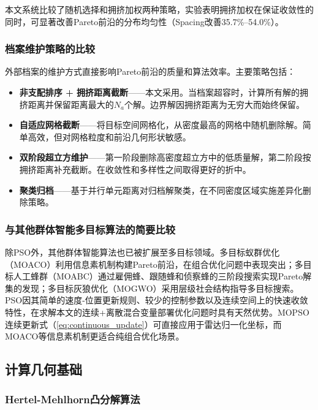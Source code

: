 本文系统比较了随机选择和拥挤加权两种策略，实验表明拥挤加权在保证收敛性的同时，可显著改善Pareto前沿的分布均匀性（Spacing改善35.7\%--54.0\%）。

\subsubsection{档案维护策略的比较}

外部档案的维护方式直接影响Pareto前沿的质量和算法效率。主要策略包括：

\begin{itemize}
    \item \textbf{非支配排序 + 拥挤距离截断\cite{Deb2002,Raquel2005}}——本文采用。当档案超容时，计算所有解的拥挤距离并保留距离最大的$N_a$个解。边界解因拥挤距离为无穷大而始终保留。
    \item \textbf{自适应网格截断\cite{Coello2004,Knowles2000}}——将目标空间网格化，从密度最高的网格中随机删除解。简单高效，但对网格粒度和前沿几何形状敏感。
    \item \textbf{双阶段超立方维护\cite{Liu2023}}——第一阶段删除高密度超立方中的低质量解，第二阶段按拥挤距离补充截断。在收敛性和多样性之间取得更好的折中。
    \item \textbf{聚类归档\cite{Zhang2024}}——基于并行单元距离对归档解聚类，在不同密度区域实施差异化删除策略。
\end{itemize}

\subsubsection{与其他群体智能多目标算法的简要比较}

除PSO外，其他群体智能算法也已被扩展至多目标领域。多目标蚁群优化（MOACO）利用信息素机制构建Pareto前沿，在组合优化问题中表现突出；多目标人工蜂群（MOABC）通过雇佣蜂、跟随蜂和侦察蜂的三阶段搜索实现Pareto解集的发现；多目标灰狼优化（MOGWO）采用层级社会结构指导多目标搜索。PSO因其简单的速度-位置更新规则、较少的控制参数以及连续空间上的快速收敛特性，在求解本文的连续+离散混合变量部署优化问题时具有天然优势。MOPSO连续更新式（\ref{eq:continuous_update}）可直接应用于雷达归一化坐标，而MOACO等信息素机制更适合纯组合优化场景。

\subsection{计算几何基础}

\subsubsection{Hertel-Mehlhorn凸分解算法}


